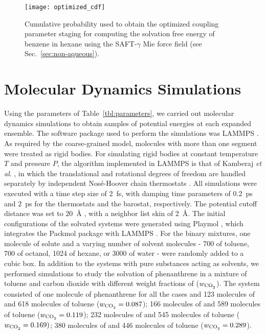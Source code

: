 \documentclass[preprint]{elsarticle}
\begin{document}
	\begin{figure}
		\centering
		\texttt{[image: optimized\_cdf]}
		\caption{Cumulative probability used to obtain the optimized coupling parameter staging for computing the solvation free energy of benzene in hexane using the SAFT-$\gamma$ Mie force field (see Sec.~\ref{sec:non-aqueous}).}
		\label{fig:optimized_cdf}
	\end{figure}
	
	\section{Molecular Dynamics Simulations}\label{mds}
	
	Using the parameters of Table~\ref{tbl:parameters}, we carried out molecular dynamics simulations to obtain samples of potential energies at each expanded ensemble. The software package used to perform the simulations was LAMMPS \cite{lammps}. As required by the coarse-grained model, molecules with more than one segment were treated as rigid bodies. For simulating rigid bodies at constant temperature $T$ and pressure $P$, the algorithm implemented in LAMMPS is that of Kamberaj \textit{et al}. \cite{kamberaj}, in which the translational and rotational degrees of freedom are handled separately by independent Nos\'{e}-Hoover chain thermostats \cite{PhysRevA.31.1695}. All simulations were executed with a time step size of 2~fs, with damping time parameters of 0.2~ps and 2~ps for the thermostats and the barostat, respectively. The potential cutoff distance was set to 20~$\text{\AA}$ \cite{muller2017}, with a neighbor list skin of 2~$\text{\AA}$. The initial configurations of the solvated systems were generated using Playmol \cite{playmol}, which integrates the Packmol package \cite{packmol} with LAMMPS \cite{lammps}. For the binary mixtures, one molecule of solute and a varying number of solvent molecules - 700 of toluene, 700 of octanol, 1024 of hexane, or 3000 of water - were randomly added to a cubic box. In addition to the systems with pure substances acting as solvents, we performed simulations to study the solvation of phenanthrene in a mixture of toluene and carbon dioxide with different weight fractions of  ($w_\text{\ce{CO_2}}$). The system consisted of one molecule of phenanthrene for all the cases and 123 molecules of  and 618 molecules of toluene ($w_\text{\ce{CO_2}} = 0.087$); 166 molecules of  and 589 molecules of toluene ($w_\text{\ce{CO_2}} = 0.119$); 232 molecules of  and 545 molecules of toluene ($w_\text{\ce{CO_2}} = 0.169)$; 380 molecules of  and 446 molecules of toluene ($w_\text{\ce{CO_2}} = 0.289$).
	
\end{document}
